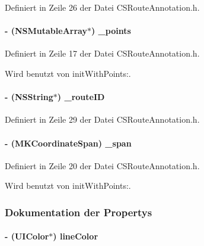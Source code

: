 Definiert in Zeile 26 der Datei CSRouteAnnotation.h.\hypertarget{interface_c_s_route_annotation_a975d9e7d09b9150af827aa054e0d19a6}{
\paragraph[{\_\-points}]{\setlength{\rightskip}{0pt plus 5cm}-\/ (NSMutableArray$\ast$) {\bf \_\-points}}\hfill}
\label{interface_c_s_route_annotation_a975d9e7d09b9150af827aa054e0d19a6}


Definiert in Zeile 17 der Datei CSRouteAnnotation.h.

Wird benutzt von initWithPoints:.\hypertarget{interface_c_s_route_annotation_a0bf15691d61df903641f20d2ff015792}{
\paragraph[{\_\-routeID}]{\setlength{\rightskip}{0pt plus 5cm}-\/ (NSString$\ast$) {\bf \_\-routeID}}\hfill}
\label{interface_c_s_route_annotation_a0bf15691d61df903641f20d2ff015792}


Definiert in Zeile 29 der Datei CSRouteAnnotation.h.\hypertarget{interface_c_s_route_annotation_ace21640a062565e3945123770d623a7f}{
\paragraph[{\_\-span}]{\setlength{\rightskip}{0pt plus 5cm}-\/ (MKCoordinateSpan) {\bf \_\-span}}\hfill}
\label{interface_c_s_route_annotation_ace21640a062565e3945123770d623a7f}


Definiert in Zeile 20 der Datei CSRouteAnnotation.h.

Wird benutzt von initWithPoints:.

\subsubsection{Dokumentation der Propertys}
\hypertarget{interface_c_s_route_annotation_a9c0ec690061a38e929c03ac92f0f7f36}{
\paragraph[{lineColor}]{\setlength{\rightskip}{0pt plus 5cm}-\/ (UIColor$\ast$) lineColor}\hfill}
\label{interface_c_s_route_annotation_a9c0ec690061a38e929c03ac92f0f7f36}


